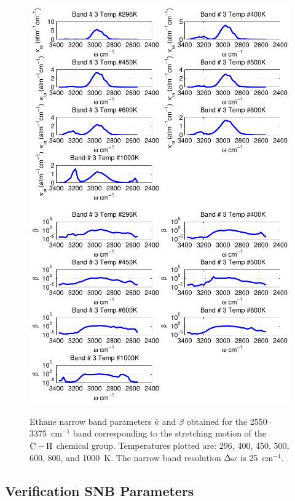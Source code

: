 \begin{figure}[p]
\begin{center}
\includegraphics[width=5.0in]{Figures/Ethane_Kappa_Band3_MALKMUS.pdf}
\includegraphics[width=5.0in]{Figures/Ethane_Beta_Band3_MALKMUS.pdf}
\end{center}
\caption{Ethane narrow band parameters $\bar{\kappa}$ and $\beta$ obtained for the 2550--3375~cm$^{-1}$ band corresponding to the stretching motion of the $\rm C-H$ chemical group. Temperatures plotted are: 296, 400, 450, 500, 600, 800, and 1000~K. The narrow band resolution $\Delta \omega$ is 25~cm$^{-1}$.\label{fig:ethane_kappa_beta3}}
\end{figure}

\FloatBarrier

\subsection{Verification SNB Parameters}

